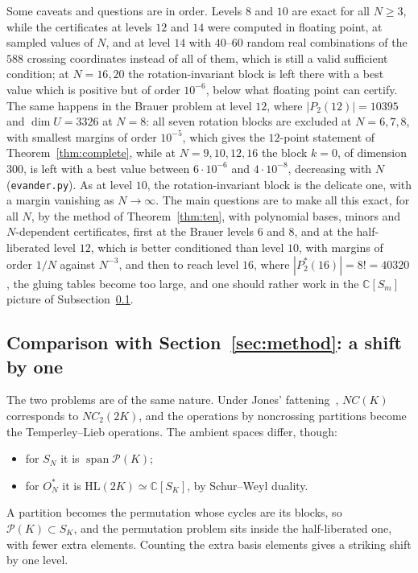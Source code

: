 \documentclass[11pt]{amsart}
\theoremstyle{definition}
\theoremstyle{remark}
\theoremstyle{plain}
\numberwithin{equation}{section}
\numberwithin{table}{section}
\newcommand{\C}{\mathbb C}
\newcommand{\HL}{\mathrm{HL}}
\DeclareMathOperator{\spn}{span}
\begin{document}
Some caveats and questions are in order. Levels $8$ and $10$ are exact for all $N\ge3$, while the certificates at levels $12$ and $14$ were computed in floating point, at sampled values of $N$, and at level $14$ with $40$--$60$ random real combinations of the $588$ crossing coordinates instead of all of them, which is still a valid sufficient condition; at $N=16,20$ the rotation-invariant block is left there with a best value which is positive but of order $10^{-6}$, below what floating point can certify. The same happens in the Brauer problem at level $12$, where $|P_2(12)|=10395$ and $\dim U=3326$ at $N=8$: all seven rotation blocks are excluded at $N=6,7,8$, with smallest margins of order $10^{-5}$, which gives the $12$-point statement of Theorem~\ref{thm:complete}, while at $N=9,10,12,16$ the block $k=0$, of dimension $300$, is left with a best value between $6\cdot10^{-6}$ and $4\cdot10^{-8}$, decreasing with $N$ (\texttt{evander.py}). As at level $10$, the rotation-invariant block is the delicate one, with a margin vanishing as $N\to\infty$. The main questions are to make all this exact, for all $N$, by the method of Theorem~\ref{thm:ten}, with polynomial bases, minors and $N$-dependent certificates, first at the Brauer levels $6$ and $8$, and at the half-liberated level $12$, which is better conditioned than level $10$, with margins of order $1/N$ against $N^{-3}$, and then to reach level $16$, where $|P_2^*(16)|=8!=40320$, the gluing tables become too large, and one should rather work in the $\C[S_m]$ picture of Subsection~\ref{sec:shift}.

\subsection{Comparison with Section~\ref{sec:method}: a shift by one}\label{sec:shift}

The two problems are of the same nature. Under Jones' fattening~\cite{jo2}, $NC(K)$ corresponds to $NC_2(2K)$, and the operations
by noncrossing partitions become the Temperley--Lieb operations. The ambient spaces differ, though:
\begin{itemize}
\item for $S_N$ it is $\spn\mathcal P(K)$;
\item for $O_N^*$ it is $\HL(2K)\simeq\C[S_K]$, by Schur--Weyl duality.
\end{itemize}
A partition becomes the permutation whose cycles are its blocks, so $\mathcal P(K)\subset S_K$, and the permutation
problem sits inside the half-liberated one, with fewer extra elements. Counting the extra basis elements gives a striking
shift by one level.
\end{document}
